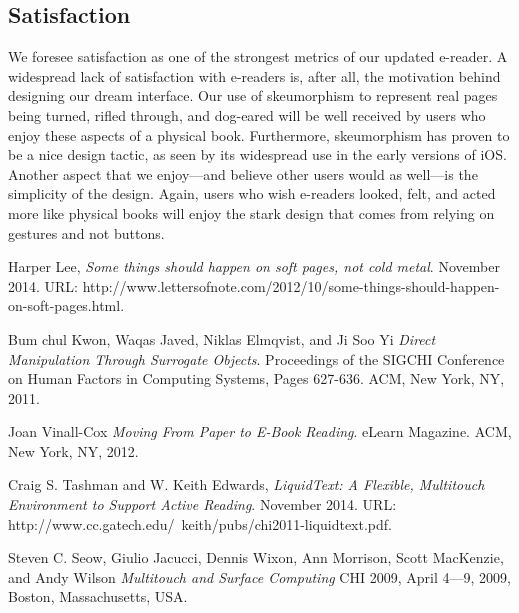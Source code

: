 \documentclass[11pt, oneside]{article}   	%
\begin{document}
\subsection {Satisfaction}
We foresee satisfaction as one of the strongest metrics of our updated e-reader. A widespread lack of satisfaction with e-readers is, after all, the motivation behind designing our dream interface. Our use of skeumorphism to represent real pages being turned, rifled through, and dog-eared will be well received by users who enjoy these aspects of a physical book. Furthermore, skeumorphism has proven to be a nice design tactic, as seen by its widespread use in the early versions of iOS. Another aspect that we enjoy---and believe other users would as well---is the simplicity of the design. Again, users who wish e-readers looked, felt, and acted more like physical books will enjoy the stark design that comes from relying on gestures and not buttons.

\begin{thebibliography}{9}

  Harper Lee,
  \emph{Some things should happen on soft pages, not cold metal}.
  November 2014.
  URL: http://www.lettersofnote.com/2012/10/some-things-should-happen-on-soft-pages.html.
  
  Bum chul Kwon, Waqas Javed, Niklas Elmqvist, and Ji Soo Yi
  \emph{Direct Manipulation Through Surrogate Objects}.
  Proceedings of the SIGCHI Conference on Human Factors in Computing Systems,
  Pages 627-636.
  ACM, New York, NY,
  2011.
  
  Joan Vinall-Cox
  \emph{Moving From Paper to E-Book Reading}.
  eLearn Magazine.
  ACM, New York, NY,
  2012.
  
  Craig S. Tashman and W. Keith Edwards,
  \emph{LiquidText: A Flexible, Multitouch Environment to Support Active Reading}.
  November 2014.
  URL: http://www.cc.gatech.edu/~keith/pubs/chi2011-liquidtext.pdf.
  
  Steven C. Seow, Giulio Jacucci, Dennis Wixon, Ann Morrison, Scott MacKenzie, and Andy Wilson
  \emph{ Multitouch and Surface Computing}
  CHI 2009, April 4---9, 2009, Boston, Massachusetts, USA.


\end{thebibliography}
\end{document}
